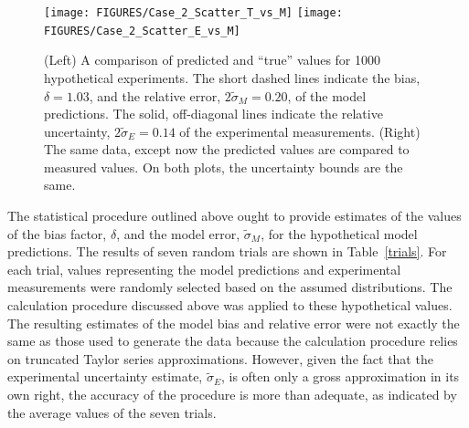 \begin{figure}[t]
\begin{center}
\texttt{[image: FIGURES/Case\_2\_Scatter\_T\_vs\_M]}
\texttt{[image: FIGURES/Case\_2\_Scatter\_E\_vs\_M]}
\end{center}
\caption[Verification of the model error calculation, Case 2.]{(Left) A comparison of predicted and ``true'' values for 1000 hypothetical
experiments. The short dashed lines indicate the bias, $\delta=1.03$, and the relative error, $2\widetilde{\sigma}_M=0.20$, of the model predictions.
The solid, off-diagonal lines indicate the relative uncertainty, $2\widetilde{\sigma}_E=0.14$ of the experimental measurements.
(Right) The same data, except now the predicted values are compared to measured values. On both plots, the uncertainty bounds are the same.}
\label{Case_2_Scatter}
\end{figure}

The statistical procedure outlined above ought to provide estimates of the values of the bias factor, $\delta$, and the model error, $\widetilde{\sigma}_M$, for the
hypothetical model predictions. The results of seven random trials are shown in Table~\ref{trials}. For each trial, values representing the model
predictions and experimental measurements were randomly selected based on the assumed distributions. The calculation procedure discussed above was applied to these
hypothetical values. The resulting estimates of the model bias and relative error were not exactly the same as those used to generate the data
because the calculation procedure relies on truncated Taylor series approximations.
However, given the fact that the experimental uncertainty estimate,
$\widetilde{\sigma}_E$, is often only a gross approximation in its own right, the accuracy of the procedure is more than adequate, as indicated by the average values
of the seven trials.

